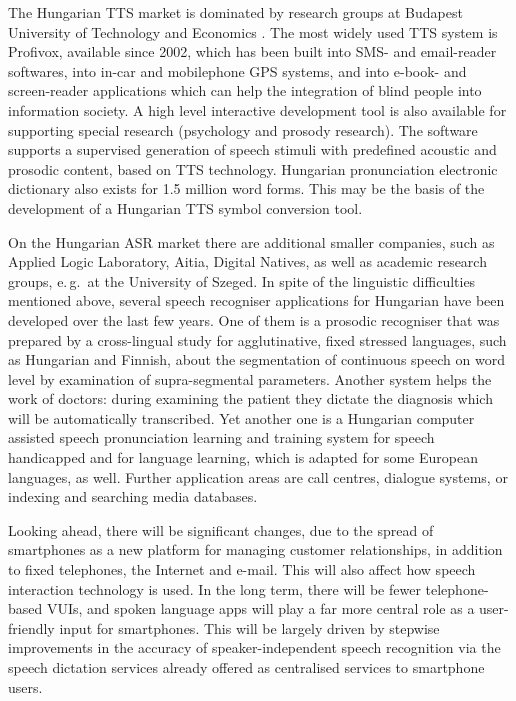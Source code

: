 \begin{multicols}{2}
The Hungarian TTS market is dominated by research groups at Budapest University of Technology and Economics \cite{bme}. The most widely used TTS system is Profivox, available since 2002, which has been built into SMS- and email-reader softwares, into in-car and mobilephone GPS systems, and into e-book- and screen-reader applications which can help the integration of blind people into information society. A high level interactive development tool is also available for supporting special research (psychology and prosody research). The software supports a supervised generation of speech stimuli with predefined acoustic and prosodic content, based on TTS technology. Hungarian pronunciation electronic dictionary also exists for 1.5 million word forms. This may be the basis of the development of a Hungarian TTS symbol conversion tool.

On the Hungarian ASR market there are additional smaller companies, such as Applied Logic Laboratory, Aitia, Digital Natives, as well as academic research groups, e.\,g.~at the University of Szeged. In spite of the linguistic difficulties mentioned above, several speech recogniser applications for Hungarian have been developed over the last few years. One of them is a prosodic recogniser that was prepared by a cross-lingual study for agglutinative, fixed stressed languages, such as Hungarian and Finnish, about the segmentation of continuous speech on word level by examination of supra-segmental parameters. Another system helps the work of doctors: during examining the patient they dictate the diagnosis which will be automatically transcribed. Yet another one is a Hungarian computer assisted speech pronunciation learning and training system for speech handicapped and for language learning, which is adapted for some European languages, as well. Further application areas are call centres, dialogue systems, or indexing and searching media databases. 

Looking ahead, there will be significant changes, due to the spread of smartphones as a new platform for managing customer relationships, in addition to fixed telephones, the Internet and e-mail. This will also affect how speech interaction technology is used. In the long term, there will be fewer telephone-based VUIs, and spoken language apps will play a far more central role as a user-friendly input for smartphones. This will be largely driven by stepwise improvements in the accuracy of speaker-independent speech recognition via the speech dictation services already offered as centralised services to smartphone users.


\end{multicols}
